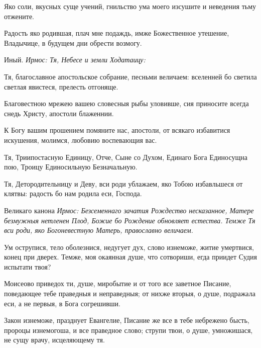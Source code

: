 

Яко соли, вкусных суще учений, гнильство ума моего изсушите и неведения тьму отжените.




Радость яко родившая, плач мне подаждь, имже Божественное утешение, Владычице, в будущем дни обрести возмогу.


Иный. \itshape Ирмос\normalfont{}: Тя, Небесе и земли Ходатаицу:



Тя, благославное апостольское собрание, песньми величаем: вселенней бо светила светлая явистеся, прелесть отгоняще.




Благовестною мрежею вашею словесныя рыбы уловивше, сия приносите всегда снедь Христу, апостоли блаженнии.



К Богу вашим прошением помяните нас, апостоли, от всякаго избавитися искушения, молимся, любовию воспевающия вас.



Тя, Триипостасную Единицу, Отче, Сыне со Духом, Единаго Бога Единосущна пою, Троицу Единосильную Безначальную.




Тя, Детородительницу и Деву, вси роди ублажаем, яко Тобою избавльшеся от клятвы: радость бо нам родила еси, Господа.


Великаго канона \itshape Ирмос\normalfont{}: Безсеменнаго зачатия Рождество несказанное, Матере безмужныя нетленен Плод, Божие бо Рождение обновляет естества. Темже Тя вси роди, яко Богоневестную Матерь, православно величаем.


Ум острупися, тело оболезнися, недугует дух, слово изнеможе, житие умертвися, конец при дверех. Темже, моя окаянная душе, что сотвориши, егда приидет Судия испытати твоя?


Моисеово приведох ти, душе, миробытие и от того все заветное Писание, поведающее тебе праведныя и неправедныя; от нихже вторыя, о душе, подражала еси, а не первыя, в Бога согрешивши.


Закон изнеможе, празднует Евангелие, Писание же все в тебе небрежено бысть, пророцы изнемогоша, и все праведное слово; струпи твои, о душе, умножишася, не сущу врачу, исцеляющему тя.


